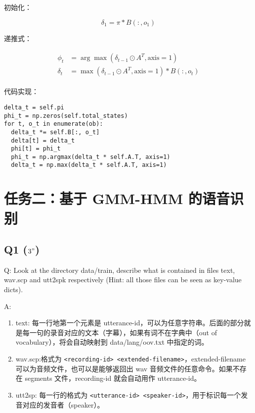 \documentclass[degree=project, degree-type=project]{thuthesis}
\begin{document}
初始化：

\begin{equation}
  \delta_1 = \pi * B(:, o_1)
\end{equation}

递推式：

\begin{align}
  \begin{split}
    \phi_t &= \arg \max(\delta_{t-1} \odot A^T, \text{axis}=1) \\
    \delta_t &= \max(\delta_{t-1} \odot A^T, \text{axis}=1) * B(:, o_t)
  \end{split}
\end{align}

代码实现：

  \begin{verbatim}
delta_t = self.pi
phi_t = np.zeros(self.total_states)
for t, o_t in enumerate(ob):
  delta_t *= self.B[:, o_t]
  delta[t] = delta_t
  phi[t] = phi_t
  phi_t = np.argmax(delta_t * self.A.T, axis=1)
  delta_t = np.max(delta_t * self.A.T, axis=1)
  \end{verbatim}

\chapter{任务二：基于 GMM-HMM 的语音识别}

\section{Q1 ($3"$)}

Q: Look at the directory data/train, describe what is contained in files text, wav.scp and utt2spk respectively (Hint: all those files can be seen as key-value dicts).

A:

\begin{enumerate}
  \item text: 每一行地第一个元素是 utterance-id，可以为任意字符串。后面的部分就是每一句的录音对应的文本（字幕），如果有词不在字典中（out of vocabulary），将会自动映射到 data/lang/oov.txt 中指定的词。
  \item wav.scp:格式为 \texttt{<recording-id> <extended-filename>}，extended-filename 可以为音频文件，也可以是能够返回出 wav 音频文件的任意命令。如果不存在 segments 文件，recording-id 就会自动用作 utterance-id。
  \item utt2sp: 每一行的格式为 \texttt{<utterance-id> <speaker-id>}，用于标识每一个发音对应的发音者（speaker）。
\end{enumerate}
\end{document}
